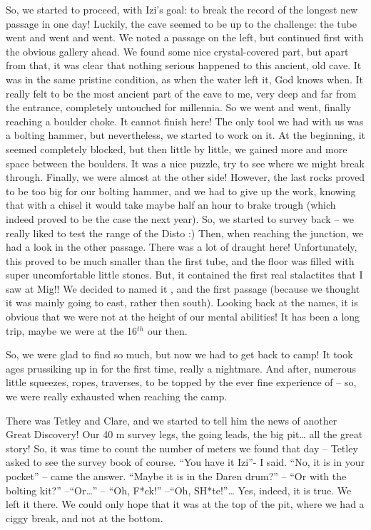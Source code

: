So, we started to proceed, with Izi's goal: to break the record of the
longest new passage in one day! Luckily, the cave seemed to be up to the
challenge: the tube went and went and went. We noted a passage on the
left, but continued first with the obvious gallery ahead. We found some
nice crystal-covered part, but apart from that, it was clear that
nothing serious happened to this ancient, old cave. It was in the same
pristine condition, as when the water left it, God knows when. It really
felt to be the most ancient part of the cave to me, very deep and far
from the entrance, completely untouched for millennia. So we went and
went, finally reaching a boulder choke. It cannot finish here! The only
tool we had with us was a bolting hammer, but nevertheless, we started
to work on it. At the beginning, it seemed completely blocked, but then
little by little, we gained more and more space between the boulders. It
was a nice puzzle, try to see where we might break through. Finally, we
were almost at the other side! However, the last rocks proved to be too
big for our bolting hammer, and we had to give up the work, knowing that
with a chisel it would take maybe half an hour to brake trough (which
indeed proved to be the case the next year). So, we started to survey
back -- we really liked to test the range of the Disto :) Then, when
reaching the junction, we had a look in the other passage. There was a
lot of draught here! Unfortunately, this proved to be much smaller than
the first tube, and the floor was filled with super uncomfortable little
stones. But, it contained the first real stalactites that I saw at Mig!!
We decided to named it , and the first passage
 (because we thought it was mainly going to east,
rather then south). Looking back at the names, it is obvious that we
were not at the height of our mental abilities! It has been a long trip,
maybe we were at the 16\(^{th}\) our then.

So, we were glad to find so much, but now we had to get back to camp! It
took ages prussiking up in  for the first time,
really a nightmare. And after, numerous little squeezes, ropes,
traverses, to be topped by the ever fine experience of  --
so, we were really exhausted when reaching the camp.

There was Tetley and Clare, and we started to tell him the news of
another Great Discovery! Our 40 m survey legs, the going leads, the big
pit\ldots{} all the great story! So, it was time to count the number of
meters we found that day -- Tetley asked to see the survey book of
course. ``You have it Izi''- I said. ``No, it is in your pocket'' --
came the answer. ``Maybe it is in the Daren drum?'' -- ``Or with the
bolting kit?'' --``Or\ldots{}'' -- ``Oh, F*ck!'' --``Oh,
SH*te!''\ldots{} Yes, indeed, it is true. We left it there. We could
only hope that it was at the top of the pit, where we had a ciggy break,
and not at the bottom.

